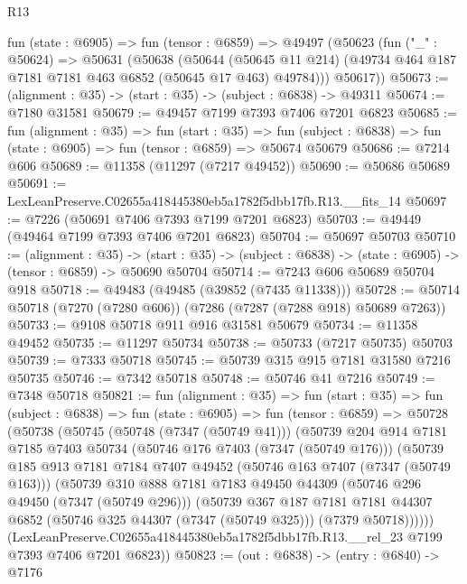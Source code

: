 \begin{lexlean}{R13}
\begin{coremodule}
  fun (state : @6905) =>
  fun (tensor : @6859) =>
  @49497
    (@50623
      (fun ("_" : @50624) =>
      @50631
        (@50638
          (@50644
            (@50645 @11 @214)
            (@49734 @464 @187 @7181 @7181 @463 @6852 (@50645 @17 @463) @49784)))
        @50617))
@50673 := (alignment : @35) -> (start : @35) -> (subject : @6838) -> @49311
@50674 := @7180 @31581
@50679 := @49457 @7199 @7393 @7406 @7201 @6823
@50685 := fun (alignment : @35) =>
  fun (start : @35) =>
  fun (subject : @6838) => fun (state : @6905) => fun (tensor : @6859) => @50674 @50679
@50686 := @7214 @606
@50689 := @11358 (@11297 (@7217 @49452))
@50690 := @50686 @50689
@50691 := LexLeanPreserve.C02655a418445380eb5a1782f5dbb17fb.R13.__fits_14
@50697 := @7226 (@50691 @7406 @7393 @7199 @7201 @6823)
@50703 := @49449 (@49464 @7199 @7393 @7406 @7201 @6823)
@50704 := @50697 @50703
@50710 := (alignment : @35) ->
  (start : @35) -> (subject : @6838) -> (state : @6905) -> (tensor : @6859) -> @50690 @50704
@50714 := @7243 @606 @50689 @50704 @918
@50718 := @49483 (@49485 (@39852 (@7435 @11338)))
@50728 := @50714 @50718 (@7270 (@7280 @606)) (@7286 (@7287 (@7288 @918) @50689 @7263))
@50733 := @9108 @50718 @911 @916 @31581 @50679
@50734 := @11358 @49452
@50735 := @11297 @50734
@50738 := @50733 (@7217 @50735) @50703
@50739 := @7333 @50718
@50745 := @50739 @315 @915 @7181 @31580 @7216 @50735
@50746 := @7342 @50718
@50748 := @50746 @41 @7216
@50749 := @7348 @50718
@50821 := fun (alignment : @35) =>
  fun (start : @35) =>
  fun (subject : @6838) =>
  fun (state : @6905) =>
  fun (tensor : @6859) =>
  @50728
    (@50738
      (@50745
        (@50748 (@7347 (@50749 @41)))
        (@50739
          @204
          @914
          @7181
          @7185
          @7403
          @50734
          (@50746 @176 @7403 (@7347 (@50749 @176)))
          (@50739
            @185
            @913
            @7181
            @7184
            @7407
            @49452
            (@50746 @163 @7407 (@7347 (@50749 @163)))
            (@50739
              @310
              @888
              @7181
              @7183
              @49450
              @44309
              (@50746 @296 @49450 (@7347 (@50749 @296)))
              (@50739
                @367
                @187
                @7181
                @7181
                @44307
                @6852
                (@50746 @325 @44307 (@7347 (@50749 @325)))
                (@7379 @50718))))))
      (LexLeanPreserve.C02655a418445380eb5a1782f5dbb17fb.R13.__rel_23
        @7199
        @7393
        @7406
        @7201
        @6823))
@50823 := (out : @6838) -> (entry : @6840) -> @7176

\end{coremodule}
\end{lexlean}
